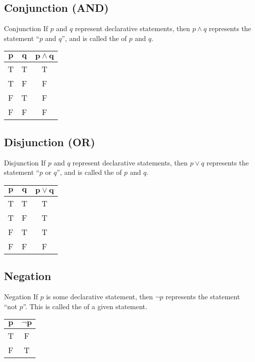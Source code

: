 \documentclass[../notes.tex]{subfiles}
\begin{document}
			\subsection[Conjunction]{Conjunction (AND)}
				\begin{definition}{Conjunction}
					If $p$ and $q$ represent declarative statements, then $p \land q$ represents the statement ``$p$ and $q$'', and is called the  of $p$ and $q$.
				\end{definition}
				\nopagebreak
				\begin{center}
					\begin{tabular}{|c c | c|}
						\hline
						$\mathbf{p}$ & $\mathbf{q}$ & $\mathbf{p \land q}$\\
						\hline
						T & T & T\\
						T & F & F\\
						F & T & F\\
						F & F & F\\
						\hline
					\end{tabular}	
				\end{center}
			\subsection[Disjunction]{Disjunction (OR)}
				\begin{definition}{Disjunction}
					If $p$ and $q$ represent declarative statements, then $p \lor q$ represents the statement ``$p$ or $q$'', and is called the  of $p$ and $q$.
				\end{definition}
				\nopagebreak
				\begin{center}
					\begin{tabular}{|c c | c|}
						\hline
						$\mathbf{p}$ & $\mathbf{q}$ & $\mathbf{p \lor q}$\\
						\hline
						T & T & T\\
						T & F & T\\
						F & T & T\\
						F & F & F\\
						\hline
					\end{tabular}	
				\end{center}
			\subsection{Negation}
				\begin{definition}{Negation}
					If $p$ is some declarative statement, then $\lnot p$ represents the statement ``not $p$''. This is called the  of a given statement.
				\end{definition}
				\nopagebreak
				\begin{center}
					\begin{tabular}{| c | c |}
						\hline
						$\mathbf{p}$ & $\mathbf{\lnot p}$\\
						\hline
						T & F\\
						F & T\\
						\hline
					\end{tabular}
				\end{center}
\end{document}
